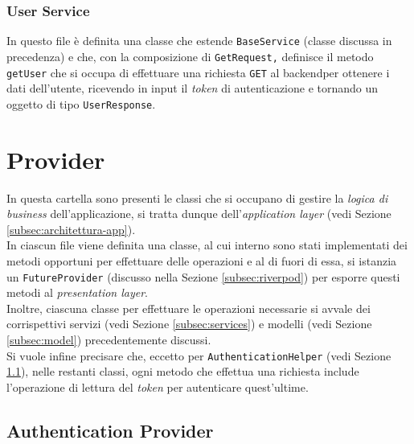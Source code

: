 \subsubsection*{User Service}
\label{subsubsec:user-service}

In questo file è definita una classe che estende \lstinline{BaseService} (classe discussa in precedenza) e che, con la composizione di \lstinline{GetRequest,} definisce il metodo \lstinline{getUser} che si occupa di effettuare una richiesta \lstinline{GET} al \gls{backend}\glsoccur per ottenere i dati dell'utente, ricevendo in input il \emph{token} di autenticazione e tornando un oggetto di tipo \lstinline{UserResponse}.

\section{Provider}
\label{sec:provider}

In questa cartella sono presenti le classi che si occupano di gestire la \emph{logica di business} dell'applicazione, si tratta dunque dell'\emph{application layer} (vedi Sezione \ref{subsec:architettura-app}).\\
In ciascun file viene definita una classe, al cui interno sono stati implementati dei metodi opportuni per effettuare delle operazioni e al di fuori di essa, si istanzia un \lstinline{FutureProvider} \cite{site:future-provider} (discusso nella Sezione \ref{subsec:riverpod}) per esporre questi metodi al \emph{presentation layer}.\\
Inoltre, ciascuna classe per effettuare le operazioni necessarie si avvale dei corrispettivi servizi (vedi Sezione \ref{subsec:services}) e modelli (vedi Sezione \ref{subsec:model}) precedentemente discussi. \\
Si vuole infine precisare che, eccetto per \lstinline{AuthenticationHelper} (vedi Sezione \ref{subsec:authentication-provider}), nelle restanti classi, ogni metodo che effettua una richiesta include l'operazione di lettura del \emph{token} per autenticare quest'ultime.

\subsection{Authentication Provider}
\label{subsec:authentication-provider}

